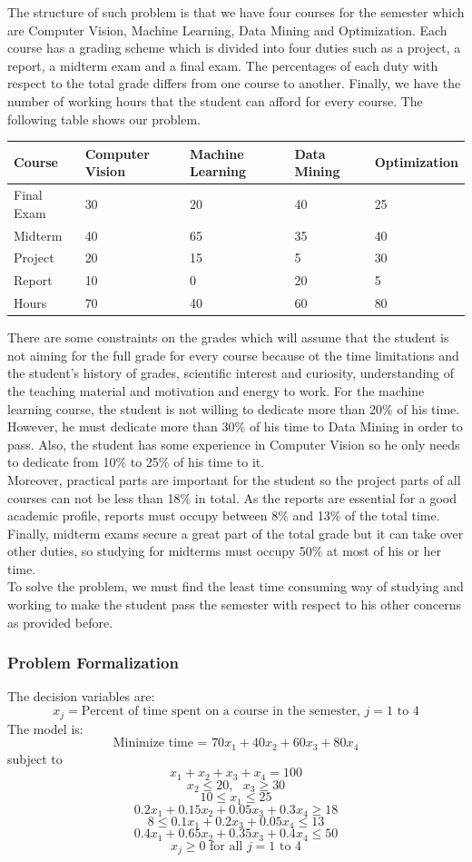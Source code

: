 The structure of such problem is that we have four courses for the semester which are Computer Vision, Machine Learning, Data Mining and Optimization. Each course has a grading scheme which is divided into four duties such as a project, a report, a midterm exam and a final exam. The percentages of each duty with respect to the total grade differs from one course to another. Finally, we have the number of working hours that the student can afford for every course. The following table shows our problem.
\begin{center}
	\begin{tabu} to 0.95\textwidth { |X[c]|X[c]X[c]X[c]X[c]| }
		\hline
		Course & Computer Vision & Machine Learning & Data Mining & Optimization \\
		\hline
		Final Exam & 30 & 20 & 40 & 25 \\
		Midterm & 40 & 65 & 35 & 40 \\
		Project & 20 & 15 & 5 & 30 \\
		Report & 10 & 0 & 20 & 5 \\
		\hline
		Hours & 70 & 40 & 60 & 80 \\
		\hline
	\end{tabu}
\end{center}
There are some constraints on the grades which will assume that the student is not aiming for the full grade for every course because ot the time limitations and the student's history of grades, scientific interest and curiosity, understanding of the teaching material and motivation and energy to work. For the machine learning course, the student is not willing to dedicate more than 20\% of his time. However, he must dedicate more than 30\% of his time to Data Mining in order to pass. Also, the student has some experience in Computer Vision so he only needs to dedicate from 10\% to 25\% of his time to it. \\
Moreover, practical parts are important for the student so the project parts of all courses can not be less than 18\% in total. As the reports are essential for a good academic profile, reports must occupy between 8\% and 13\% of the total time. Finally, midterm exams secure a great part of the total grade but it can take over other duties, so studying for midterms must occupy 50\% at most of his or her time. \\
To solve the problem, we must find the least time consuming way of studying and working to make the student pass the semester with respect to his other concerns as provided before.
\subsubsection{Problem Formalization}
The decision variables are: \\
\[x_j = \text{Percent of time spent on a course in the semester, } j = 1\text{ to }4\]
The model is: \\
\[\text{Minimize time = } 70x_1 + 40x_2 + 60x_3 + 80x_4\]
subject to
\[x_1 + x_2 + x_3 + x_ 4 = 100\]
\[x_2 \leq 20, \text{{ }}x_3 \geq 30\]
\[10 \leq x_1 \leq 25\]
\[0.2x_1 + 0.15x_2 + 0.05x_3 + 0.3x_4 \geq 18 \]
\[8 \leq 0.1x_1 + 0.2x_3 + 0.05x_4 \leq 13 \]
\[0.4x_1 + 0.65x_2 + 0.35x_3 + 0.4x_4 \leq 50 \]
\[x_j \geq 0 \text{ for all } j = 1\text{ to }4 \]

